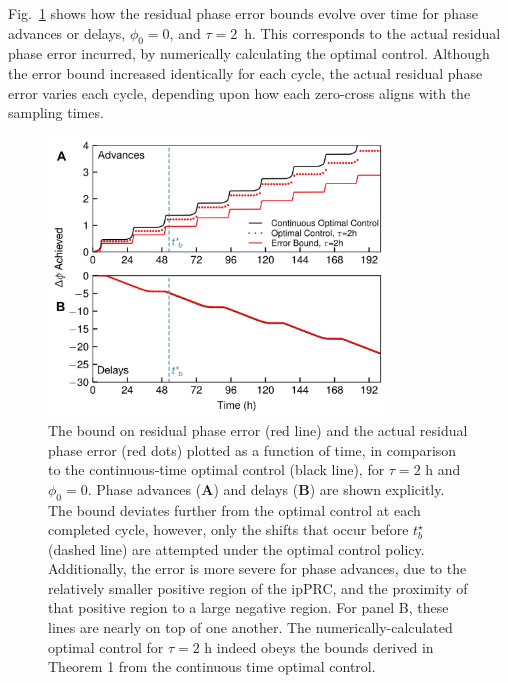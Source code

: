 Fig.~\ref{fig:stepsize1} shows how the residual phase error bounds evolve over time for phase advances or delays, $\phi_0=0$, and $\tau=2$~h.
This corresponds to the actual residual phase error incurred, by numerically calculating the optimal control.
Although the error bound increased identically for each cycle, the actual residual phase error varies each cycle, depending upon how each zero-cross aligns with the sampling times.

\begin{figure}[p]
    \begin{center}
    \includegraphics[width=3.5in]{chap6/figures/figure_4.png}
\end{center}
      \caption{\label{fig:stepsize1} The bound on residual phase error (red line) and the actual residual phase error (red dots) plotted as a function of time, in comparison to the continuous-time optimal control (black line), for $\tau=2$ h and $\phi_0=0$. Phase advances (\textbf{A}) and delays (\textbf{B}) are shown explicitly. The bound deviates further from the optimal control at each completed cycle, however, only the shifts that occur before $t^\star_b$ (dashed line) are attempted under the optimal control policy. Additionally, the error is more severe for phase advances, due to the relatively smaller positive region of the ipPRC, and the proximity of that positive region to a large negative region. For panel B, these lines are nearly on top of one another. The numerically-calculated optimal control for $\tau=2$ h indeed obeys the bounds derived in Theorem 1 from the continuous time optimal control.}
\end{figure}


